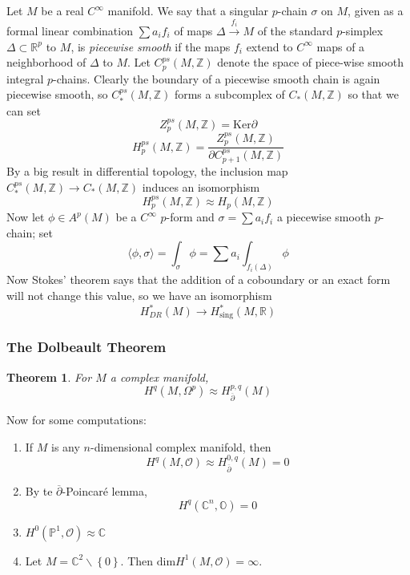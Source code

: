 \documentclass{article}
\newtheorem{thm}{Theorem}
\begin{document}
\indent Let $M$ be a real $ C^{\infty}$ manifold. We say that a singular $p$-chain $\sigma$ on $M$, given as a formal linear combination $\sum a_i f_i$ of maps $\Delta \xrightarrow{f_i} M$ of the standard $p$-simplex $\Delta \subset \mathbb{R}^p$ to $M$, is \textit{piecewise smooth} if the maps $f_i$ extend to $ C^{\infty}$ maps of a neighborhood of $\Delta$ to $M$. Let $C^{ps}_p \left( M, \mathbb{Z} \right) $ denote the space of piece-wise smooth integral $p$-chains. Clearly the boundary of a piecewise smooth chain is again piecewise smooth, so $C^{ps}_* \left( M, \mathbb{Z} \right) $ forms a subcomplex of $C_* \left( M, \mathbb{Z} \right) $ so that we can set
\[
	Z^{ps}_p \left( M, \mathbb{Z} \right) = \mathrm{Ker}\partial
\]
\[
	H^{ps}_p \left( M, \mathbb{Z} \right) = \frac{Z^{ps}_p \left( M, \mathbb{Z} \right) }{\partial C^{ps}_{p+1} \left( M, \mathbb{Z} \right) }
\]
By a big result in differential topology, the inclusion map $ C^{ps}_* \left( M, \mathbb{Z} \right) \to C_* \left( M, \mathbb{Z} \right) $ induces an isomorphism
\[
	H^{ps}_p \left( M, \mathbb{Z} \right) \approx H_p \left( M, \mathbb{Z} \right) 
\]
\indent Now let $ \phi \in A^p (M)$ be a $ C^{\infty} $ $p$-form and $\sigma = \sum a_i f_i$ a piecewise smooth $p$-chain; set
\[
	\langle \phi, \sigma \rangle = \int_{\sigma} \phi = \sum a_i \int_{f_i (\Delta)} \phi
\]
Now Stokes' theorem says that the addition of a coboundary or an exact form will not change this value, so we have an isomorphism
\[
	H^*_{DR} (M) \to H^*_{ \mathrm{sing} } (M, \mathbb{R})
\]

\subsubsection{The Dolbeault Theorem}


\begin{thm}

For $M$ a complex manifold,
\[
	H^q (M, \Omega^p) \approx H^{p,q}_{ \overline{\partial} } (M)
\]


\end{thm}
Now for some computations:

\begin{enumerate}
\item If $M$ is any $n$-dimensional complex manifold, then
	\[
		H^q (M, \mathcal{O}) \approx H^{0,q}_{ \overline{\partial} }(M) = 0
	\]
\item By te $ \overline{\partial}$-Poincar\'e lemma,
	\[
		H^q ( \mathbb{C}^n, \mathbb{O} ) = 0
	\]
\item $H^0 ( \mathbb{P}^1, \mathcal{O}) \approx \mathbb{C}$
\item Let $M = \mathbb{C}^2 \backslash \left\{ 0 \right\} $. Then $ \mathrm{dim}H^1 ( M, \mathcal{O}) = \infty$.
\end{enumerate}
\end{document}
